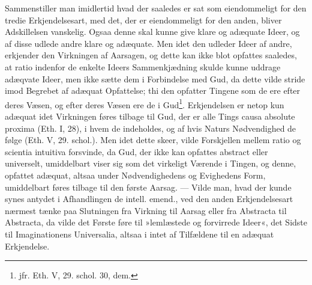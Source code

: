 \documentclass[12pt,a4paper]{book}
\newcommand{\opage}[1]{\marginnote{\footnotesize\textit{[#1]}}}
\begin{document}
\opage{103} \setcounter{footnote}{0}%
Sammenstiller man imidlertid hvad der saaledes er sat som
eiendommeligt for den tredie Erkjendelsesart, med det, der er
eiendommeligt for den anden, bliver Adskillelsen vanskelig. Ogsaa
denne skal kunne give klare og adæquate Ideer, og af disse udlede
andre klare og adæquate. Men idet den udleder Ideer af andre,
erkjender den Virkningen af Aarsagen, og dette kan ikke blot
opfattes saaledes, at ratio indenfor de enkelte Ideers
Sammenkjædning skulde kunne uddrage adæqvate Ideer, men ikke sætte
dem i Forbindelse med Gud, da dette vilde stride imod Begrebet af
adæquat Opfattelse; thi den opfatter Tingene som de ere efter deres
Væsen, og efter deres Væsen ere de i Gud\footnote{jfr. Eth. V, 29.
schol. 30, dem.}. Erkjendelsen er netop kun adæquat idet Virkningen
føres tilbage til Gud, der er alle Tings causa absolute proxima
(Eth. I, 28), i hvem de indeholdes, og af hvis Naturs Nødvendighed
de følge (Eth. V, 29. schol.). Men idet dette skeer, vilde
Forskjellen mellem ratio og scientia intuitiva forsvinde, da Gud,
der ikke kan opfattes abstract eller universelt, umiddelbart viser
sig som det virkeligt Værende i Tingen, og denne, opfattet adæquat,
altsaa under Nødvendighedens og Evighedens Form, umiddelbart føres
tilbage til den første Aarsag. --- Vilde man, hvad der kunde synes
antydet i Afhandlingen de intell. emend., ved den anden
Erkjendelsesart nærmest tænke paa Slutningen fra Virkning til
Aarsag eller fra Abstracta til Abstracta, da vilde det Første føre
til »lemlæstede og forvirrede Ideer«, det Sidste til Imaginationens
Universalia, altsaa i intet af Tilfældene til en adæquat
Erkjendelse.
\end{document}

